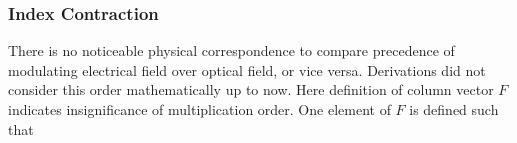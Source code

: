 \documentclass[thesis]{deutez}
\begin{document}

    

    


    
    \subsubsection{Index Contraction}

    There is no noticeable physical correspondence to compare precedence of modulating electrical field over optical field, or vice versa. Derivations did not consider this order mathematically up to now. Here definition of column vector $F$ indicates insignificance of multiplication order. One element of $F$ is defined such that
\end{document}
